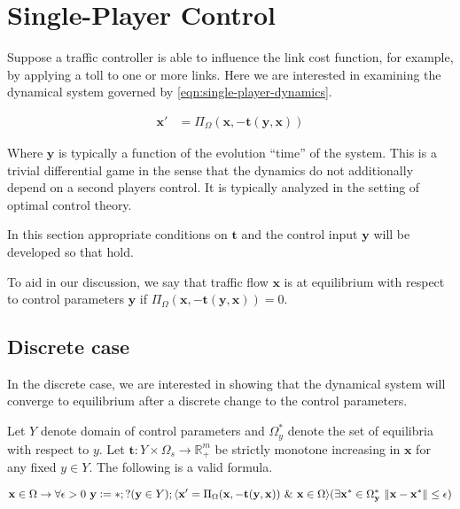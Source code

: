 \section{Single-Player Control}

Suppose a traffic controller is able to influence the link cost function, for example, by applying a toll to one or more links.
Here we are interested in examining the dynamical system governed by \eqref{eqn:single-player-dynamics}. 

\begin{align}
    \mathbf{x}' &= \Pi_{\Omega} (\mathbf{x}, -\mathbf{t}(\mathbf{y}, \mathbf{x}))\label{eqn:single-player-dynamics}
\end{align}

Where $\mathbf{y}$ is typically a function of the evolution ``time'' of the system.
This is a trivial differential game in the sense that the dynamics do not additionally depend on a second players control.
It is typically analyzed in the setting of optimal control theory. \citep{bardi2008optimal}

In this section appropriate conditions on $\mathbf{t}$ and the control input $\mathbf{y}$ will be developed so that  hold.

To aid in our discussion, we say that traffic flow $\mathbf{x}$ is at equilibrium with respect to control parameters $\mathbf{y}$ if $\Pi_{\Omega} (\mathbf{x}, -\mathbf{t}(\mathbf{y}, \mathbf{x}))=0$.

\subsection{Discrete case}

In the discrete case, we are interested in showing that the dynamical system will converge to equilibrium after a discrete change to the control parameters.

\begin{theorem}
Let $Y$ denote domain of control parameters and $\Omega^*_y$ denote the set of equilibria with respect to $y$. Let $\mathbf{t}: Y\times \Omega_s \to \mathbb{R}^m_+$ be strictly monotone increasing in $\mathbf{x}$ for any fixed $y\in Y$. The following is a valid formula.

$$\mathbf{x} \in \Omega \to \forall \epsilon > 0\  \mathbf{y}\vcentcolon= *;?(\mathbf{y}\in Y); \langle \mathbf{x}'=\Pi_{\Omega}(\mathbf{x}, -\mathbf{t}(\mathbf{y}, \mathbf{x}))\ \&\ \mathbf{x}\in \Omega\rangle (\exists \mathbf{x}^*\in \Omega^*_\mathbf{y}\ \|\mathbf{x} - \mathbf{x}^*\| \leq \epsilon)$$
\end{theorem}

